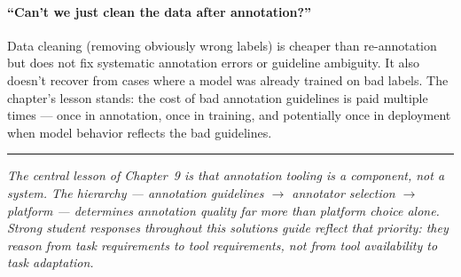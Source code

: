 \paragraph{``Can't we just clean the data after annotation?''}
Data cleaning (removing obviously wrong labels) is cheaper than re-annotation but does not fix systematic annotation errors or guideline ambiguity. It also doesn't recover from cases where a model was already trained on bad labels. The chapter's lesson stands: the cost of bad annotation guidelines is paid multiple times --- once in annotation, once in training, and potentially once in deployment when model behavior reflects the bad guidelines.

\bigskip
\begin{center}
\rule{0.5\textwidth}{0.4pt}
\end{center}
\bigskip

\noindent\textit{The central lesson of Chapter~9 is that annotation tooling is a component, not a system. The hierarchy --- annotation guidelines $\rightarrow$ annotator selection $\rightarrow$ platform --- determines annotation quality far more than platform choice alone. Strong student responses throughout this solutions guide reflect that priority: they reason from task requirements to tool requirements, not from tool availability to task adaptation.}
